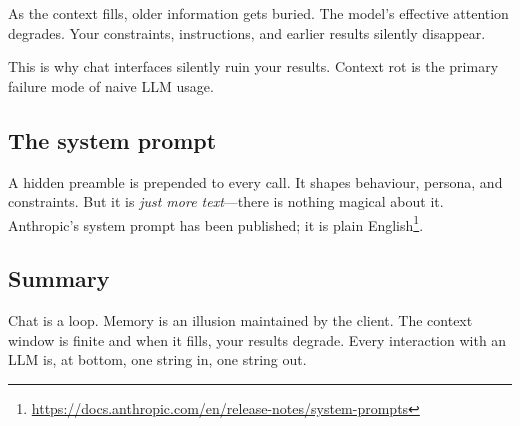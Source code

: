 As the context fills, older information gets buried.  The model's
effective attention degrades.  Your constraints, instructions, and
earlier results silently disappear.

\begin{keyresult}
  This is why chat interfaces silently ruin your results.  Context rot
  is the primary failure mode of naive LLM usage.
\end{keyresult}

\subsection{The system prompt}

A hidden preamble is prepended to every call.  It shapes behaviour,
persona, and constraints.  But it is \emph{just more text}---there is
nothing magical about it.  Anthropic's system prompt has been published;
it is plain English\footnote{%
  \url{https://docs.anthropic.com/en/release-notes/system-prompts}}.

\subsection{Summary}

Chat is a loop.  Memory is an illusion maintained by the client.  The
context window is finite and when it fills, your results degrade.  Every
interaction with an LLM is, at bottom, one string in, one string out.
